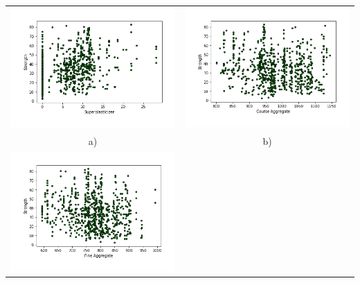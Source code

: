 \begin{center}
    \begin{tabular}{cc}
        \includegraphics[scale=0.5]{images/Plot_05.png}&
        \includegraphics[scale=0.5]{images/Plot_06.png}\\
        a) & b)\\
        \includegraphics[scale=0.5]{images/Plot_07.png}&

\end{tabular}
\end{center}
